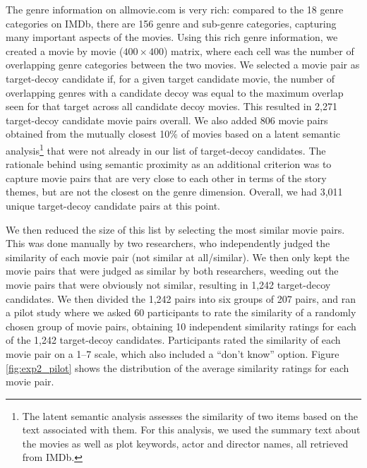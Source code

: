 \documentclass[12pt, a4paper]{article}
\begin{document}
The genre information on allmovie.com is very rich: compared to the 18 genre categories on IMDb, there are 156 genre and sub-genre categories, capturing many important aspects of the movies. Using this rich genre information, we created a movie by movie ($400 \times 400$) matrix, where each cell was the number of overlapping genre categories between the two movies. We selected a movie pair as target-decoy candidate if, for a given target candidate movie, the number of overlapping genres with a candidate decoy was equal to the maximum overlap seen for that target across all candidate decoy movies. This resulted in 2,271 target-decoy candidate movie pairs overall.
We also added 806 movie pairs obtained from the mutually closest 10\% of movies based on a latent semantic analysis\footnote{The latent semantic analysis assesses the similarity of two items based on the text associated with them. For this analysis, we used the summary text about the movies as well as plot keywords, actor and director names, all retrieved from IMDb.} that were not already in our list of target-decoy candidates. The rationale behind using semantic proximity as an additional criterion was to capture movie pairs that are very close to each other in terms of the story themes, but are not the closest on the genre dimension. Overall, we had 3,011 unique target-decoy candidate pairs at this point.

We then reduced the size of this list by selecting the most similar movie pairs. This was done manually by two researchers, who independently judged the similarity of each movie pair (not similar at all/similar). We then only kept the movie pairs that were judged as similar by both researchers, weeding out the movie pairs that were obviously not similar, resulting in 1,242 target-decoy candidates. We then divided the 1,242 pairs into six groups of 207 pairs, and ran a pilot study where we asked 60 participants to rate the similarity of a randomly chosen group of movie pairs, obtaining 10 independent similarity ratings for each of the 1,242 target-decoy candidates. Participants rated the similarity of each movie pair on a 1--7 scale, which also included a ``don't know'' option. Figure \ref{fig:exp2_pilot}  shows the distribution of the average similarity ratings for each movie pair.
\end{document}
